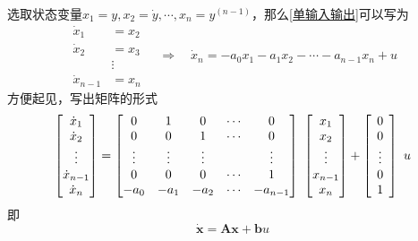 选取状态变量$x_1 = y, x_2 = \dot{y}, \cdots, x_n = y^{(n-1)}$，那么\eqref{单输入输出}可以写为
\begin{equation}
	\begin{aligned}
		\dot{x}_1 &= x_2\\
		\dot{x}_2 &= x_3\\
		&\vdots\\
		\dot{x}_{n-1} &= x_n
	\end{aligned}
	\quad \Rightarrow \quad \dot{x}_n = -a_0x_1-a_1x_2-\cdots -a_{n-1}x_n+u
\end{equation}
方便起见，写出矩阵的形式
\begin{equation}
	\begin{bmatrix}
		 \dot{x}_1\\
		\dot{x}_2\\
		\hspace*{2mm}\vdots\hspace*{2mm}\\
		\dot{x}_{n-1}\\
		\dot{x}_n
	\end{bmatrix}
	=
	\begin{bmatrix}
		0 & 1 & 0 & \cdots & 0\\
		0 & 0 & 1 & \cdots & 0\\
		\vdots & \vdots & \vdots & & \vdots\\
		0 & 0 & 0 & \cdots & 1\\
		-a_0 & -a_1 & -a_2 & \cdots & -a_{n-1}
	\end{bmatrix}
	\,\,
	\begin{bmatrix}
		x_1\\
		x_2\\
		\hspace*{2mm}\vdots\hspace*{2mm}\\
		x_{n-1}\\
		x_{n}
	\end{bmatrix}
	+
	\begin{bmatrix}
		0\\
		0\\
	\hspace*{2mm}\vdots\hspace*{2mm}\\
		0\\
		1
	\end{bmatrix}
	\,\,
	u
\end{equation}
即
\begin{equation}
	\bm{\dot{x}}= \bm{A}\bm{x}+\bm{b}u
\end{equation}

